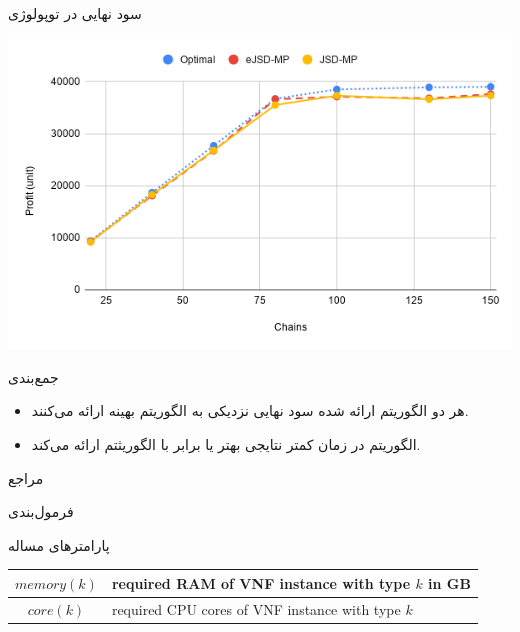 \documentclass{beamer}
\makeatletter
\newcommand{\RTList}{\raggedleft\rightskip\@totalleftmargin}
\makeatother
\begin{document}
\begin{persian}
\begin{frame}{سود نهایی در توپولوژی }
\begin{center}
        \includegraphics[scale=0.5]{images/chart-6.png}
    \end{center}
\end{frame}
\begin{frame}{جمع‌بندی}
    \begin{itemize}\RTList{}
        \item هر دو الگوریتم ارائه شده سود نهایی نزدیکی به الگوریتم بهینه ارائه می‌کنند.
        \item الگوریتم  در زمان کمتر نتایجی بهتر یا برابر با الگوریثتم  ارائه می‌کند.
    \end{itemize}
\end{frame}
\begin{frame}[shrink=25]{مراجع}
    \begin{latin}
        \printbibliography[heading=none]
    \end{latin}
\end{frame}
\begin{frame}{فرمول‌بندی}
    \par پارامترهای مساله
    \begin{center}\begin{latin}\begin{tabular}{|c|p{5cm}|}
        \hline
        \(memory(k)\) & required RAM of VNF instance with type \(k\) in GB \\
        \hline
        \(core(k)\) & required CPU cores of VNF instance with type \(k\) \\

\end{tabular}
\end{latin}
\end{center}
\end{frame}
\end{persian}
\end{document}
